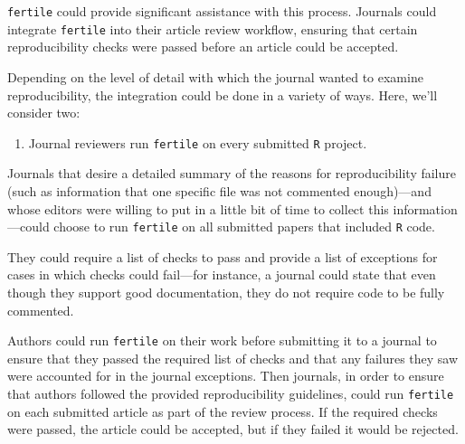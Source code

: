 \documentclass[12pt,twoside]{reedthesis}
\providecommand{\tightlist}{%
  \setlength{\itemsep}{0pt}\setlength{\parskip}{0pt}}
\begin{document}
\texttt{fertile} could provide significant assistance with this process. Journals could integrate \texttt{fertile} into their article review workflow, ensuring that certain reproducibility checks were passed before an article could be accepted.

Depending on the level of detail with which the journal wanted to examine reproducibility, the integration could be done in a variety of ways. Here, we'll consider two:
\begin{enumerate}
\def\labelenumi{\arabic{enumi}.}
\tightlist
\item
  Journal reviewers run \texttt{fertile} on every submitted \texttt{R} project.
\end{enumerate}
Journals that desire a detailed summary of the reasons for reproducibility failure (such as information that one specific file was not commented enough)---and whose editors were willing to put in a little bit of time to collect this information---could choose to run \texttt{fertile} on all submitted papers that included \texttt{R} code.

They could require a list of checks to pass and provide a list of exceptions for cases in which checks could fail---for instance, a journal could state that even though they support good documentation, they do not require code to be fully commented.

Authors could run \texttt{fertile} on their work before submitting it to a journal to ensure that they passed the required list of checks and that any failures they saw were accounted for in the journal exceptions. Then journals, in order to ensure that authors followed the provided reproducibility guidelines, could run \texttt{fertile} on each submitted article as part of the review process. If the required checks were passed, the article could be accepted, but if they failed it would be rejected.
\end{document}
